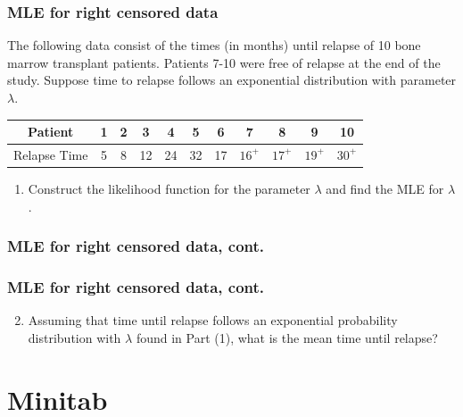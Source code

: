 \begin{frame}
\frametitle{MLE for right censored data}
The following data consist of the times (in months) until relapse of 10 bone marrow transplant patients.  Patients 7-10 were free of relapse at the end of the study.  Suppose time to relapse follows an exponential distribution with parameter $\lambda$.
\begin{center}
\begin{tabular}{c|cccccccccc}
Patient & 1 & 2 & 3 & 4 & 5 & 6 & 7 & 8 & 9 & 10\\ \hline
Relapse Time & 5 & 8 & 12 & 24 & 32 & 17 & $16^+$ & $17^+$ & $19^+$ & $30^+$\\
\end{tabular}
\end{center}
\begin{enumerate}
\item Construct the likelihood function for the parameter $\lambda$ and find the MLE for $\lambda$.
\end{enumerate}
\end{frame}

\begin{frame}
\frametitle{MLE for right censored data, cont.}
\end{frame}


\begin{frame}
\frametitle{MLE for right censored data, cont.}
\begin{enumerate}
\setcounter{enumi}{1}
\item Assuming that time until relapse follows an exponential probability distribution with $\lambda$ found in Part (1), what is the mean time until relapse?
\end{enumerate}
\vskip200pt
\end{frame}


\section[Minitab]{Minitab}
